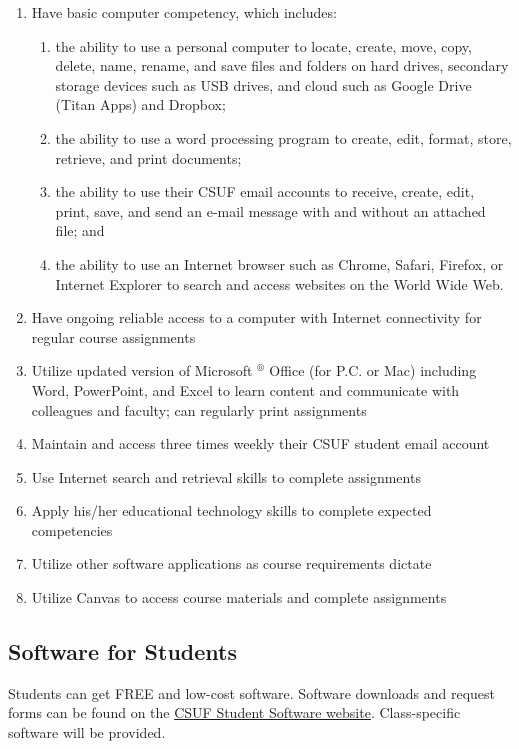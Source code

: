 \documentclass{syllabus}
\begin{document}
{\begin{enumerate}
\itemsep0pt	
\item Have basic computer competency, which includes:
\begin{enumerate}
\itemsep0pt
\item the ability to use a personal computer to locate, create, move, copy, delete, name, rename, and save files and folders on hard drives, secondary storage devices such as USB drives, and cloud such as Google Drive (Titan Apps) and Dropbox;
\item the ability to use a word processing program to create, edit, format, store, retrieve, and print documents;
\item the ability to use their CSUF email accounts to receive, create, edit, print, save, and send an e-mail message with and without an attached file; and
\item the ability to use an Internet browser such as Chrome, Safari, Firefox, or Internet Explorer to search and access websites on the World Wide Web.
\end{enumerate}
\item Have ongoing reliable access to a computer with Internet connectivity for regular course assignments
\item Utilize updated version of Microsoft ${ }^{\circledR}$ Office (for P.C. or Mac) including Word, PowerPoint, and Excel to learn content and communicate with colleagues and faculty; can regularly print assignments
\item Maintain and access three times weekly their CSUF student email account
\item Use Internet search and retrieval skills to complete assignments
\item Apply his/her educational technology skills to complete expected competencies
\item Utilize other software applications as course requirements dictate
\item Utilize Canvas to access course materials and complete assignments
\end{enumerate}

\subsection*{Software for Students}
Students can get FREE and low-cost software. Software downloads and request forms can be found on the \href{https://www.fullerton.edu/it/students/software/}{CSUF Student Software website}. Class-specific software will be provided.

}
\end{document}
